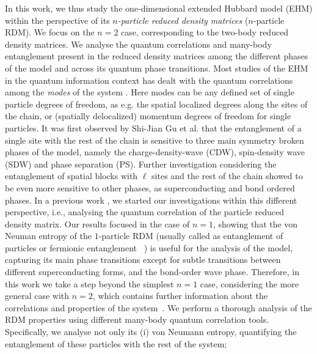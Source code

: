 \documentclass[prb,reprint,showpacs,twocolumn,superscriptaddress]{revtex4-2}
\begin{document}
In this work, we thus study the one-dimensional extended Hubbard model (EHM) \cite{hubbard63} within the perspective of its \textit{$n$-particle reduced density matrices} ($n$-particle RDM). 
We focus on the $n=2$ case, corresponding to the two-body reduced density matrices. 
We analyse the quantum correlations and many-body entanglement present in the reduced density matrices among the different phases of the model and across its quantum phase transitions. 
Most studies of the EHM in the quantum information context has dealt with the quantum correlations  among the \textit{modes} of the system  \cite{Jian2004,Deng2006,Yang2008,Mund2009,Liu2011,Gigena2013,Barbiero2017,Chung2021,Rausch2020,Pandey2017}. 
Here modes can be any defined set of single particle degrees of freedom, as e.g. the spatial localized degrees along the sites of the chain, or (spatially delocalized) momentum degrees of freedom for single particles.
It was first observed by Shi-Jian Gu et al.\cite{Jian2004} that the entanglement of a single site with the rest of the chain is sensitive to three main symmetry broken phases of the model, 
namely the charge-density-wave (CDW), spin-density wave (SDW) and phase separation (PS).
Further investigation considering the entanglement of spatial blocks with $\ell$ sites and the rest of the chain \cite{Deng2006} showed to be even more sensitive to other phases, as superconducting and bond ordered phases.
In a previous work \cite{Iemini2015}, we started our investigations within this different perspective, i.e., analysing the quantum correlation of the particle reduced density matrix.
Our results focused in the case of $n=1$, showing that the von Neuman entropy of the $1$-particle RDM (usually called as entanglement of particles or fermionic entanglement ~\cite{iemini13b,iemini13a,iemini14,balachandran1,balachandran2,ghirardi02,ghirardi04,schliemann01a,schliemann01b,eckert02,li01,barnum04,somma04,paskauskas01,plastino09,zander10,Debarba2017,Gigena2017,Tullio2018,Gigena2020a,Benatti2020,Benavoli2021}) is  useful for the analysis of the model, capturing its main phase transitions except for subtle transitions between different superconducting forms, and the bond-order wave phase.
Therefore, in this work we take a step beyond the simplest $n=1$ case, considering the more general case with $n=2$, which contains further information
about the correlations and properties of the system~\cite{Gigena2020b}. 
We perform a thorough analysis of the RDM properties using different many-body quantum correlation tools. 
Specifically, we analyse not only its 
(i) von Neumann entropy, quantifying the entanglement of these particles with the rest of the system; 
\end{document}
